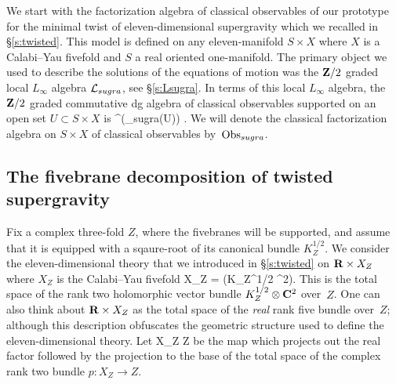 We start with the factorization algebra of classical observables of our prototype for the minimal twist of eleven-dimensional supergravity which we recalled in \S \ref{s:twisted}. 
This model is defined on any eleven-manifold $S \times X$ where $X$ is a Calabi--Yau fivefold and $S$ a real oriented one-manifold. 
The primary object we used to describe the solutions of the equations of motion was the $\mathbf{Z}/2$ graded local $L_\infty$ algebra $\mathcal L_{sugra}$, see \S \ref{s:Lsugra}. 
In terms of this local $L_\infty$ algebra, the $\mathbf{Z}/2$ graded commutative dg algebra of classical observables supported on an open set $U \subset S \times X$ is 
\beqn\label{eqn:sugraobs}
\clie^\bu\left(\cL_{sugra}(U)\right) .
\eeqn
We will denote the classical factorization algebra on $S \times X$ of classical observables by~$\operatorname{Obs}_{sugra}$.


%
%
%


\subsection{The fivebrane decomposition of twisted supergravity}\label{s:resm5}

Fix a complex three-fold $Z$, where the fivebranes will be supported, and assume that it is equipped with a sqaure-root of its canonical bundle $K^{1/2}_Z$.
We consider the eleven-dimensional theory that we introduced in \S \ref{s:twisted} on $\mathbf{R} \times X_Z$ where $X_Z$ is the Calabi--Yau fivefold
\beqn
X_Z = (K_Z^{1/2} \otimes \C^2).
\eeqn
This is the total space of the rank two holomorphic vector bundle $K_Z^{1/2} \otimes \mathbf{C}^2$ over~$Z$. 
One can also think about $\mathbf{R} \times X_Z$ as the total space of the {\em real} rank five bundle over~$Z$; although this description obfuscates the geometric structure used to define the eleven-dimensional theory.
Let 
\beqn
\pi \colon \R \times X_Z \to Z 
\eeqn
be the map which projects out the real factor followed by the projection to the base of the total space of the complex rank two bundle $p \colon X_Z \to Z$.

